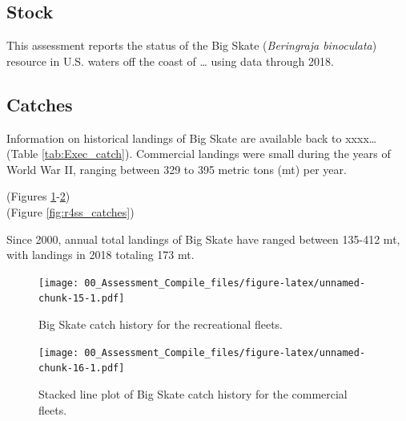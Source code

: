 \documentclass[12pt,]{article}
\begin{document}
\hypertarget{stock}{%
\subsection*{Stock}\label{stock}}

This assessment reports the status of the Big Skate
(\emph{Beringraja binoculata}) resource in U.S. waters off the coast of
\ldots{} using data through 2018.

\hypertarget{catches}{%
\subsection*{Catches}\label{catches}}

Information on historical landings of Big Skate are available back to
xxxx\ldots{} (Table \ref{tab:Exec_catch}). Commercial landings were
small during the years of World War II, ranging between 329 to 395
metric tons (mt) per year.

(Figures \ref{fig:Exec_catch1}-\ref{fig:Exec_catch2})\\
(Figure \ref{fig:r4ss_catches})

Since 2000, annual total landings of Big Skate have ranged between
135-412 mt, with landings in 2018 totaling 173 mt.

\FloatBarrier

\begin{figure}
\centering
\texttt{[image: 00\_Assessment\_Compile\_files/figure-latex/unnamed-chunk-15-1.pdf]}
\caption{Big Skate catch history for the recreational fleets.
\label{fig:Exec_catch1}}
\end{figure}

\begin{figure}
\centering
\texttt{[image: 00\_Assessment\_Compile\_files/figure-latex/unnamed-chunk-16-1.pdf]}
\caption{Stacked line plot of Big Skate catch history for the commercial
fleets. \label{fig:Exec_catch2}}
\end{figure}

\FloatBarrier
\end{document}
